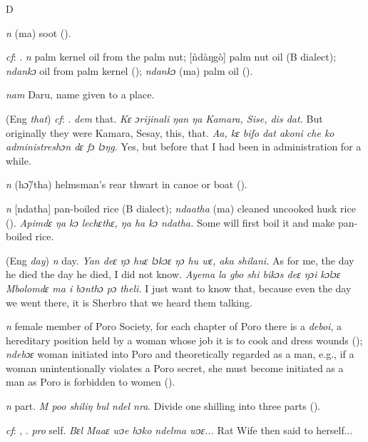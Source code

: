 \begin{letter}{D}

 \textit{n} (ma) soot (\citealt{Pichl1967}). 

 \textit{cf}: . \textit{n} palm kernel oil from the palm nut; [ǹdàŋgò] palm nut oil (B dialect); \textit{ndankɔ} oil from palm kernel (\citealt{Sumner1921}); \textit{ndankɔ} (ma) palm oil (\citealt{Pichl1967}).

 \textit{nam} Daru, name given to a place. 

 (Eng \textit{that}) \textit{cf}: . \textit{dem} that. \textit{Kɛ ɔrijinali ŋan ŋa Kamara, Sise, dis dat.} But originally they were Kamara, Sesay, this, that. \textit{Aa, kɛ bifo dat akoni che ko administreshɔn dɛ fɔ lɔŋg.} Yes, but before that I had been in administration for a while.

 \textit{n} (hɔ̃/tha) helmsman's rear thwart in canoe or boat (\citealt{Pichl1967}).

 \textit{n} [ndatha] pan-boiled rice (B dialect); \textit{ndaatha} (ma) cleaned uncooked husk rice (\citealt{Pichl1967}). \textit{Apimdɛ ŋa kɔ lechɛthɛ, ŋa ha kɔ ndatha.} Some will first boil it and make pan-boiled rice.

 (Eng \textit{day}) \textit{n} day. \textit{Yan deɛ ŋɔ huɛ lɔkɔɛ ŋɔ hu wɛ, aka shilani.} As for me, the day he died the day he died, I did not know. \textit{Ayema la gbo shi bikɔs deɛ ŋɔi kɔlɔɛ Mbolomdɛ ma i bɔnthɔ pɔ theli.} I just want to know that, because even the day we went there, it is Sherbro that we heard them talking.

 \textit{n} female member of Poro Society, for each chapter of Poro there is a \textit{deboi}, a hereditary position held by a woman whose job it is to cook and dress wounds (\citealt{Hall1938}); \textit{ndebɔɛ} woman initiated into Poro and theoretically regarded as a man, e.g., if a woman unintentionally violates a Poro secret, she must become initiated as a man as Poro is forbidden to women (\citealt{Pichl1967}).

 \textit{n} part. \textit{M poo shiliŋ bul ndel nra}. Divide one shilling into three parts (\citealt{Pichl1967}). 

 \textit{cf}: , . \textit{pro} self. \textit{Bɛl Maaɛ wɔe hɔko ndelma wɔɛ...} Rat Wife then said to herself...


\end{letter}
